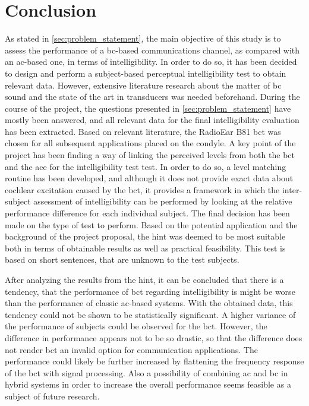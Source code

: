 \section{Conclusion}\label{sec:conclusion}
As stated in \autoref{sec:problem_statement}, the main objective of this study is to assess the performance of a \gls{bc}-based communications channel, as compared with an \gls{ac}-based one, in terms of intelligibility.
In order to do so, it has been decided to design and perform a subject-based perceptual intelligibility test to obtain relevant data. However, extensive literature research about the matter of \gls{bc} sound and the state of the art in transducers was needed beforehand.
During the course of the project, the questions presented in \autoref{sec:problem_statement} have mostly been answered, and all relevant data for the final intelligibility evaluation has been extracted.
Based on relevant literature, the RadioEar B81 \gls{bct} was chosen for all subsequent applications placed on the condyle.
A key point of the project has been finding a way of linking the perceived levels from both the \gls{bct} and the \gls{ace} for the intelligibility test test. 
In order to do so, a level matching routine has been developed, and although it does not provide exact data about cochlear excitation caused by the \gls{bct}, it provides a framework in which the inter-subject assessment of intelligibility can be performed by looking at the relative performance difference for each individual subject. 
The final decision has been made on the type of test to perform. Based on the potential application and the background of the project proposal, the \gls{hint} was deemed to be most suitable both in terms of obtainable results as well as practical feasibility. This test is based on short sentences, that are unknown to the test subjects.

After analyzing the results from the \gls{hint}, it can be concluded that there is a tendency, that the performance of \gls{bct} regarding intelligibility is might be worse than the performance of classic \gls{ac}-based systems. 
With the obtained data, this tendency could not be shown to be statistically significant. A higher variance of the performance of subjects could be observed for the \gls{bct}.
However, the difference in performance appears not to be so drastic, so that the difference does not render \gls{bct} an invalid option for communication applications. The performance could likely be further increased by flattening the frequency response of the \gls{bct} with signal processing. Also a possibility of combining \gls{ac} and \gls{bc} in hybrid systems in order to increase the overall performance seems feasible as a subject of future research.





